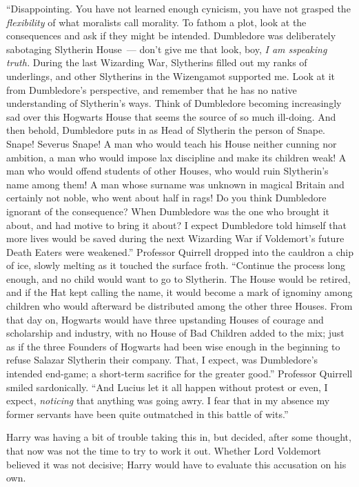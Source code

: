 ``Disappointing. You have not learned enough cynicism, you have not grasped the \emph{flexibility} of what moralists call morality. To fathom a plot, look at the consequences and ask if they might be intended. Dumbledore was deliberately sabotaging Slytherin House~--- don't give me that look, boy, \emph{I am sspeaking truth.} During the last Wizarding War, Slytherins filled out my ranks of underlings, and other Slytherins in the Wizengamot supported me. Look at it from Dumbledore's perspective, and remember that he has no native understanding of Slytherin's ways. Think of Dumbledore becoming increasingly sad over this Hogwarts House that seems the source of so much ill-doing. And then behold, Dumbledore puts in as Head of Slytherin the person of Snape. Snape! Severus Snape! A man who would teach his House neither cunning nor ambition, a man who would impose lax discipline and make its children weak! A man who would offend students of other Houses, who would ruin Slytherin's name among them! A man whose surname was unknown in magical Britain and certainly not noble, who went about half in rags! Do you think Dumbledore ignorant of the consequence? When Dumbledore was the one who brought it about, and had motive to bring it about? I expect Dumbledore told himself that more lives would be saved during the next Wizarding War if Voldemort's future Death Eaters were weakened.'' Professor Quirrell dropped into the cauldron a chip of ice, slowly melting as it touched the surface froth. ``Continue the process long enough, and no child would want to go to Slytherin. The House would be retired, and if the Hat kept calling the name, it would become a mark of ignominy among children who would afterward be distributed among the other three Houses. From that day on, Hogwarts would have three upstanding Houses of courage and scholarship and industry, with no House of Bad Children added to the mix; just as if the three Founders of Hogwarts had been wise enough in the beginning to refuse Salazar Slytherin their company. That, I expect, was Dumbledore's intended end-game; a short-term sacrifice for the greater good.'' Professor Quirrell smiled sardonically. ``And Lucius let it all happen without protest or even, I expect, \emph{noticing} that anything was going awry. I fear that in my absence my former servants have been quite outmatched in this battle of wits.''

Harry was having a bit of trouble taking this in, but decided, after some thought, that now was not the time to try to work it out. Whether Lord Voldemort believed it was not decisive; Harry would have to evaluate this accusation on his own.

